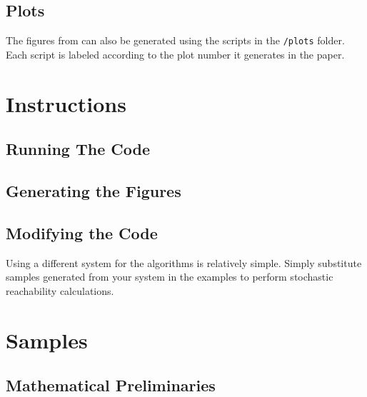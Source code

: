 \documentclass[11pt]{article}
\begin{document}
\subsection{Plots}

The figures from \cite{thorpe} can also be generated using the scripts in the \verb|/plots| folder. Each script is labeled according to the plot number it generates in the paper.


\section{Instructions}
\label{section: instructions}

\subsection{Running The Code}

\subsection{Generating the Figures}


\subsection{Modifying the Code}

Using a different system for the algorithms is relatively simple. Simply substitute samples generated from your system in the examples to perform stochastic reachability calculations.


\section{Samples}
\label{section: samples}



\subsection{Mathematical Preliminaries}
\end{document}
